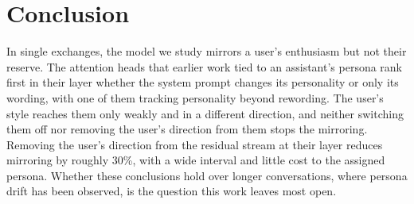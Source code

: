 \section{Conclusion}
\label{sec:conclusion}

In single exchanges, the model we study mirrors a user's enthusiasm but not their reserve. The attention heads that earlier work tied to an assistant's persona rank first in their layer whether the system prompt changes its personality or only its wording, with one of them tracking personality beyond rewording. The user's style reaches them only weakly and in a different direction, and neither switching them off nor removing the user's direction from them stops the mirroring. Removing the user's direction from the residual stream at their layer reduces mirroring by roughly 30\%, with a wide interval and little cost to the assigned persona. Whether these conclusions hold over longer conversations, where persona drift has been observed, is the question this work leaves most open.
